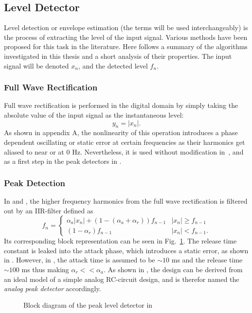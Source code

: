 \documentclass[../main2.tex]{subfiles}
\providecommand{\rootdir}{..}
\begin{document}
\subsection{Level Detector}\label{level_detection}
Level detection or envelope estimation (the terms will be used interchangeably) is the process of extracting the level of the input signal. Various methods have been proposed for this task in the literature. Here follows a summary of the algorithms investigated in this thesis and a short analysis of their properties. The input signal will be denoted $x_n$, and the detected level $f_n$.

\subsubsection{Full Wave Rectification}
Full wave rectification is performed in the digital domain by simply taking the absolute value of the input signal as the instantaneous level:
\begin{equation}
y_n = |x_n|.
\end{equation}
As shown in appendix A, the nonlinearity of this operation introduces a phase dependent oscillating or static error at certain frequencies as their harmonics get aliased to near or at 0 Hz. Nevertheless, it is used without modification in~\cite{reiss2012tutorial}, and as a first step in the peak detectors in \cite{mcnally1984dynamic} \cite{stikvoort1986digital}. 

\subsubsection{Peak Detection}\label{peak_detection}
In \cite{mcnally1984dynamic} and \cite{zolzer1997digital}, the higher frequency harmonics from the full wave rectification is filtered out by an IIR-filter defined as
\begin{equation}
f_n = \begin{cases}
    \alpha_{a} |x_n| + (1- (\alpha_{a} + \alpha_{r})) f_{n-1}  	& |x_n| \geq f_{n-1} \\
    (1-\alpha_{r}) f_{n-1} 							& |x_n| < f_{n-1}.
\end{cases}
\end{equation}
Its corresponding block representation can be seen in Fig.~\ref{fig:block_mcnally_theory_peak}. The release time constant is leaked into the attack phase, which introduces a static error, as shown in \cite{reiss2012tutorial}. However, in \cite{mcnally1984dynamic}, the attack time is assumed to be $\sim 10$ ms and the release time   $\sim 100$ ms thus making $\alpha_r << \alpha_a$. As shown in \cite{reiss2012tutorial}, the design can be derived from an ideal model of a simple analog RC-circuit design, and is therefor named the \emph{analog peak detector} accordingly.
\begin{figure}
\centerline{}
\caption{Block diagram of the peak level detector in \cite{mcnally1984dynamic}}
\label{fig:block_mcnally_theory_peak}
\end{figure}
\end{document}
